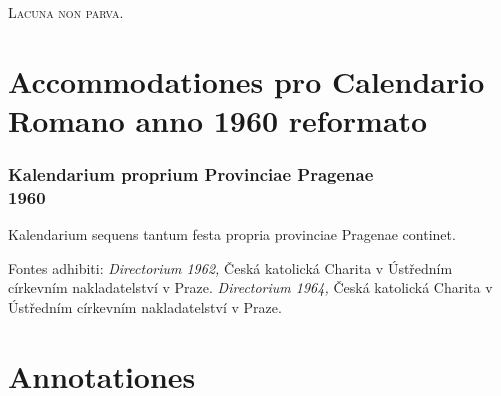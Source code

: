 \documentclass[12pt, a5paper, twoside]{book}
\begin{document}



\vfill
{\Large \textsc{Lacuna non parva.}}

\part{Accommodationes pro Calendario Romano anno 1960 reformato}

\section*{Kalendarium proprium Provinciae Pragenae\\1960}

{\footnotesize
  Kalendarium sequens tantum festa propria provinciae Pragenae
  continet.

  Fontes adhibiti:
  \emph{Directorium 1962,} Česká katolická Charita v Ústředním církevním nakladatelství v Praze.
  \emph{Directorium 1964,} Česká katolická Charita v Ústředním církevním nakladatelství v Praze.
}


\cleardoublepage




\part{Annotationes}




\printbibliography
\end{document}
